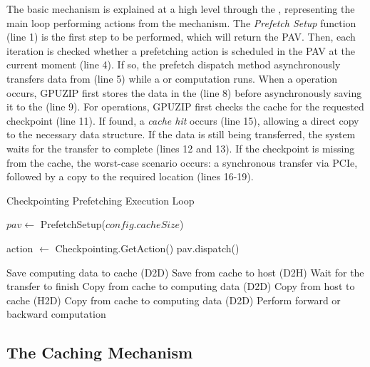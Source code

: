 \documentclass[Ingles]{ic-tese-v3}
\begin{document}
The basic \checkpointprefetching mechanism is explained at a high level through the , representing the \awave main loop performing actions from the \checkpointprefetching mechanism. The \textit{Prefetch Setup} function (line 1) is the first step to be performed, which will return the PAV. Then, each iteration is checked whether a prefetching action is scheduled in the PAV at the current moment (line 4). If so, the prefetch dispatch method asynchronously transfers data from \htd (line 5) while a \fwd or \bwd computation runs. When a \save operation occurs, GPUZIP first stores the data in the \cache (line 8) before asynchronously saving it to the \pool (line 9). For \restore operations, GPUZIP first checks the cache for the requested checkpoint (line 11). If found, a \textit{cache hit} occurs (line 15), allowing a direct \dtd copy to the necessary data structure. If the data is still being transferred, the system waits for the transfer to complete (lines 12 and 13). If the checkpoint is missing from the cache, the worst-case scenario occurs: a synchronous \htd transfer via PCIe, followed by a \dtd copy to the required location (lines 16-19).

\begin{algorithm}[h!]
\caption{Checkpointing Prefetching Execution Loop}
\label{alg:prefetching_loop}
\begin{algorithmic}[1]
\STATE $pav \gets$ PrefetchSetup($config.cacheSize$)

    \STATE action $\gets$ Checkpointing.GetAction()
        \STATE pav.dispatch()
    \ENDIF
    
        \STATE Save computing data to cache (D2D)
        \STATE Save from cache to host (D2H)
                \STATE Wait for the transfer to finish
            \ENDIF
            \STATE Copy from cache to computing data (D2D)
        \ELSE
            \STATE Copy from host to cache (H2D)
            \STATE Copy from cache to computing data (D2D)
        \ENDIF
        \STATE Perform forward or backward computation
    \ENDIF
\ENDWHILE
\end{algorithmic}
\end{algorithm}


\subsection{The Caching Mechanism}
\label{sec:caching}
\end{document}
